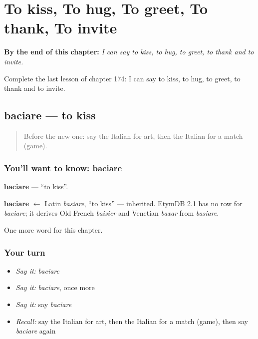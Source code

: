 
\chapter{To kiss, To hug, To greet, To thank, To invite}
\label{ch:it-to-kiss-to-hug-to-greet-to-thank-to-invite}

\begin{chapteropening}
\textbf{By the end of this chapter:} \emph{I can say to kiss, to hug, to greet, to thank and to invite.}

Complete the last lesson of chapter 174: I can say to kiss, to hug, to greet, to thank and to invite.
\end{chapteropening}

\section[baciare]{baciare — to kiss}

\label{lesson:IT-C174-baciare}



\begin{quote}
Before the new one: say the Italian for art, then the Italian for a match (game).
\end{quote}

\subsection*{You'll want to know: baciare}
\textbf{baciare} — \textquotedblleft{}to kiss\textquotedblright{}.

\begin{cousinweb}
\textbf{baciare} $\leftarrow$ Latin \emph{basiare}, \textquotedblleft{}to kiss\textquotedblright{} — inherited. EtymDB 2.1 has no row for \emph{baciare}; it derives Old French \emph{baisier} and Venetian \emph{baxar} from \emph{basiare}.
\end{cousinweb}

\begin{grammarlens}[title={What you've built}]
One more word for this chapter.
\end{grammarlens}

\subsection*{Your turn}
\begin{itemize}
\raggedright
  \item \emph{Say it:} \emph{baciare}
  \item \emph{Say it:} \emph{baciare}, once more
  \item \emph{Say it:} say \emph{baciare}
  \item \emph{Recall:} say the Italian for art, then the Italian for a match (game), then say \emph{baciare} again
\end{itemize}

